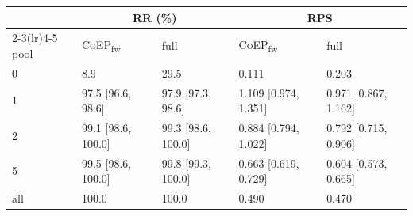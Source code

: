 \begin{tabular}{lllll}
\toprule
& \multicolumn{2}{c}{RR (\%)} & \multicolumn{2}{c}{RPS} \\
\cmidrule(lr){2-3}\cmidrule(lr){4-5}
pool & \textsc{CoEP}\textsubscript{fw} & full & \textsc{CoEP}\textsubscript{fw} & full \\
\midrule
0 & 8.9 & 29.5 & 0.111 & 0.203 \\
1 & 97.5 [96.6, 98.6] & 97.9 [97.3, 98.6] & 1.109 [0.974, 1.351] & 0.971 [0.867, 1.162] \\
2 & 99.1 [98.6, 100.0] & 99.3 [98.6, 100.0] & 0.884 [0.794, 1.022] & 0.792 [0.715, 0.906] \\
5 & 99.5 [98.6, 100.0] & 99.8 [99.3, 100.0] & 0.663 [0.619, 0.729] & 0.604 [0.573, 0.665] \\
all & 100.0 & 100.0 & 0.490 & 0.470 \\
\bottomrule
\end{tabular}
